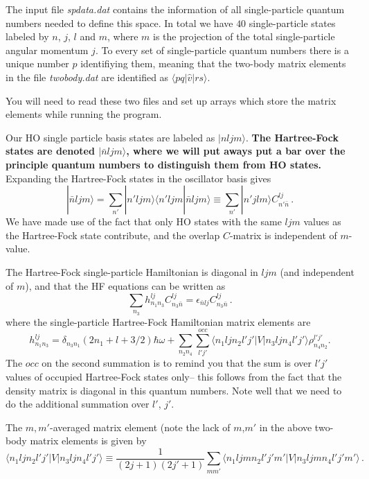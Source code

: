\documentclass[11pt,a4wide]{article}
\begin{document}
The input file {\em spdata.dat} contains the information of all single-particle quantum numbers needed to define this space. In total we have $40$ single-particle states labeled by $n$, $j$, $l$ and $m$, where $m$ is the projection of the total single-particle angular momentum $j$. To every set of single-particle quantum numbers there is a unique number $p$ identifiying them, meaning that the two-body matrix elements in the file {\em twobody.dat} are identified as 
$\langle pq \vert \hat{v} | rs \rangle$.

You will need to read these two files and set up arrays which store the matrix elements while running the program.




Our HO single particle basis states are labeled as $|nljm\rangle$.
{\bf The Hartree-Fock states are denoted $|\bar{n}ljm\rangle$, where
  we will put aways put a bar over the principle quantum numbers to
  distinguish them from HO states.}  Expanding the Hartree-Fock states
in the oscillator basis gives
\[
|\bar{n}ljm\rangle =\sum_{n'}|n'ljm\rangle\langle n'ljm|\bar{n}ljm\rangle \equiv \sum_{n'} |n'jlm\rangle C^{lj}_{n'\bar{n}} \,.
\]
We have made use of the fact that only HO states with the same $ljm$
values as the Hartree-Fock state contribute, and the overlap $C$-matrix is
independent of $m$-value.

The Hartree-Fock single-particle Hamiltonian is diagonal in
  $ljm$ (and independent of $m$), and that the HF equations can be
  written as
\[
\sum_{n_3} h^{lj}_{n_1n_3}C^{lj}_{n_3\bar{n}} = \epsilon_{\bar{n}lj}C^{lj}_{n_3\bar{n}}\,.
\]
 where the single-particle Hartree-Fock  Hamiltonian matrix elements are 
\[
h^{lj}_{n_1n_3} = \delta_{n_3 n_1}(2n_1+l + 3/2)\hbar\omega + \sum_{n_2n_4}\sum_{l'j'}^{occ}\langle n_1ljn_2l'j'|V|n_3ljn_4l'j'\rangle\rho^{l'j'}_{n_4n_2}.
\]
The $occ$ on the second summation is to remind you that the sum is over $l'j'$ values of occupied Hartree-Fock states only-- this follows from the fact that the density matrix is diagonal in this quantum numbers. Note well that we need to do the additional summation over $l'$, $j'$.


The $m,m'$-averaged matrix element (note the lack of $m$,$m'$ in the above two-body matrix elements  is given by
\begin{equation}
\label{eq:mavgTBME}
\langle n_1ljn_2l'j'|V|n_3ljn_4l'j'\rangle \equiv \frac{1}{(2j+1)(2j'+1)}\sum_{mm'}  \langle n_1ljmn_2l'j'm'|V|n_3ljmn_4l'j'm'\rangle\,.
\end{equation}
\end{document}
